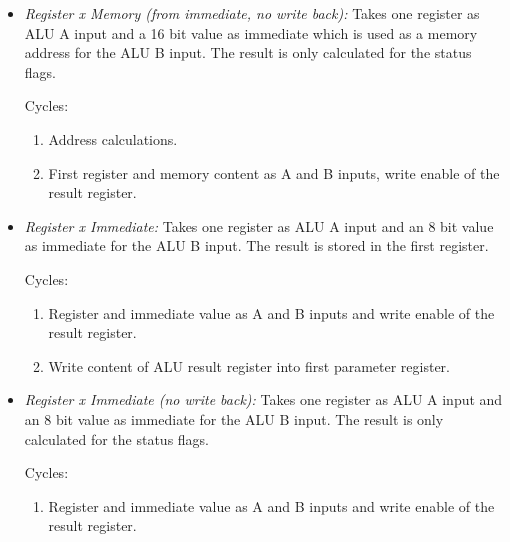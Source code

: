 \begin{itemize}
  \item \emph{Register x Memory (from immediate, no write back):} Takes one register as \gls{ALU} A input and a 16 bit value as immediate which is used as a memory address for the \gls{ALU} B input.
  The result is only calculated for the status flags.

  Cycles:
  \begin{enumerate}
    \item Address calculations.
    \item First register and memory content as A and B inputs, write enable of the result register.
  \end{enumerate}

  \item \emph{Register x Immediate:} Takes one register as \gls{ALU} A input and an 8 bit value as immediate  for the \gls{ALU} B input.
  The result is stored in the first register.

  Cycles:
  \begin{enumerate}
    \item Register and immediate value as A and B inputs and write enable of the result register.
    \item Write content of \gls{ALU} result register into first parameter register.
  \end{enumerate}

  \item \emph{Register x Immediate (no write back):} Takes one register as \gls{ALU} A input and an 8 bit value as immediate  for the \gls{ALU} B input.
  The result is only calculated for the status flags.

  Cycles:
  \begin{enumerate}
    \item Register and immediate value as A and B inputs and write enable of the result register.
  \end{enumerate}
\end{itemize}

